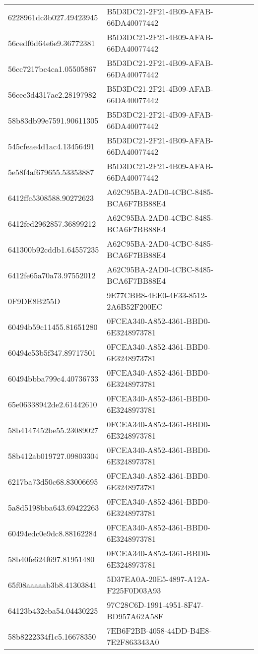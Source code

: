 \begin{tabular}{ll}
6228961dc3b027.49423945 & B5D3DC21-2F21-4B09-AFAB-66DA40077442 \\
56cedf6d64e6e9.36772381 & B5D3DC21-2F21-4B09-AFAB-66DA40077442 \\
56cc7217bc4ca1.05505867 & B5D3DC21-2F21-4B09-AFAB-66DA40077442 \\
56cee3d4317ae2.28197982 & B5D3DC21-2F21-4B09-AFAB-66DA40077442 \\
58b83db99e7591.90611305 & B5D3DC21-2F21-4B09-AFAB-66DA40077442 \\
545cfeae4d1ac4.13456491 & B5D3DC21-2F21-4B09-AFAB-66DA40077442 \\
5e58f4af679655.53353887 & B5D3DC21-2F21-4B09-AFAB-66DA40077442 \\
6412ffc5308588.90272623 & A62C95BA-2AD0-4CBC-8485-BCA6F7BB88E4 \\
6412fed2962857.36899212 & A62C95BA-2AD0-4CBC-8485-BCA6F7BB88E4 \\
641300b92cddb1.64557235 & A62C95BA-2AD0-4CBC-8485-BCA6F7BB88E4 \\
6412fe65a70a73.97552012 & A62C95BA-2AD0-4CBC-8485-BCA6F7BB88E4 \\
0F9DE8B255D & 9E77CBB8-4EE0-4F33-8512-2A6B52F200EC \\
60494b59c11455.81651280 & 0FCEA340-A852-4361-BBD0-6E3248973781 \\
60494e53b5f347.89717501 & 0FCEA340-A852-4361-BBD0-6E3248973781 \\
60494bbba799c4.40736733 & 0FCEA340-A852-4361-BBD0-6E3248973781 \\
65e06338942de2.61442610 & 0FCEA340-A852-4361-BBD0-6E3248973781 \\
58b4147452be55.23089027 & 0FCEA340-A852-4361-BBD0-6E3248973781 \\
58b412ab019727.09803304 & 0FCEA340-A852-4361-BBD0-6E3248973781 \\
6217ba73d50c68.83006695 & 0FCEA340-A852-4361-BBD0-6E3248973781 \\
5a8d5198bba643.69422263 & 0FCEA340-A852-4361-BBD0-6E3248973781 \\
60494edc0e9dc8.88162284 & 0FCEA340-A852-4361-BBD0-6E3248973781 \\
58b40fe624f697.81951480 & 0FCEA340-A852-4361-BBD0-6E3248973781 \\
65f08aaaaab3b8.41303841 & 5D37EA0A-20E5-4897-A12A-F225F0D03A93 \\
64123b432eba54.04430225 & 97C28C6D-1991-4951-8F47-BD957A62A58F \\
58b8222334f1c5.16678350 & 7EB6F2BB-4058-44DD-B4E8-7E2F863343A0 \\

\end{tabular}
